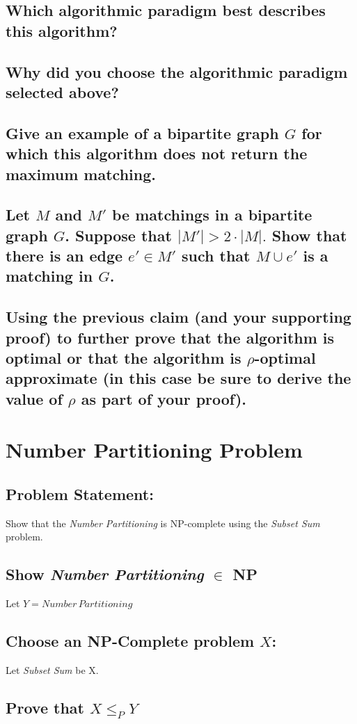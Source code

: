 \documentclass{article}
\begin{document}
\subsection{Which algorithmic paradigm best describes this algorithm?}  

\subsection{Why did you choose the algorithmic paradigm selected above?}

\subsection{Give an example of a bipartite graph $G$ for which this algorithm does not return the maximum matching.}

\subsection{Let $M$ and $M'$ be matchings in a bipartite graph $G$.  Suppose that $|M'| > 2 \cdot |M|.$  Show that there is an edge $e' \in M'$ such that $M \cup {e'}$ is a matching in $G$.}

\subsection{Using the previous claim (and your supporting proof) to further prove that the algorithm is optimal or that the algorithm is $\rho$-optimal approximate (in this case be sure to derive the value of $\rho$ as part of your proof).}


\newpage

\section{Number Partitioning Problem}

\subsection{Problem Statement:}  
Show that the \textit{Number Partitioning} is NP-complete using the \textit{Subset Sum} problem.

\subsection*{Show \textit{Number Partitioning} $\in$ NP}
Let $Y = Number \, Partitioning$

\subsection*{Choose an NP-Complete problem $X$:}
Let \textit{Subset Sum} be X.

\subsection*{Prove that $X \leq_P Y$}


\printbibliography
\end{document}
